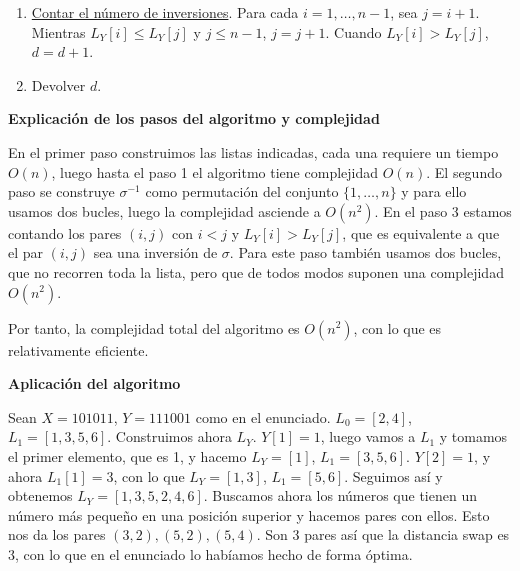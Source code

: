 \documentclass[twoside]{article}
\begin{document}
\begin{solucion}
\begin{enumerate}
\item \underline{Contar el número de inversiones}. Para cada $i=1,\dots, n-1$, sea $j=i+1$. Mientras $L_Y[i]\leq L_Y[j]$ y $j\leq n-1$, $j=j+1$. Cuando $L_Y[i]> L_Y[j]$, $d=d+1$.  

\item Devolver $d$. 
\end{enumerate}

\vspace{0.8cm}

\textbf{Explicación de los pasos del algoritmo y complejidad}

En el primer paso construimos las listas indicadas, cada una requiere un tiempo $O(n)$, luego hasta el paso 1 el algoritmo tiene complejidad $O(n)$. 
El segundo paso se construye $\sigma^{-1}$ como permutación del conjunto $\{1,\dots, n\}$ y para ello usamos dos bucles, luego la complejidad asciende a $O(n^2)$. En el paso 3 estamos contando los pares $(i,j)$ con $i<j$ y $L_Y[i]>L_Y[j]$, que es equivalente a que el par $(i,j)$ sea una inversión de $\sigma$. Para este paso también usamos dos bucles, que no recorren toda la lista, pero que de todos modos suponen una complejidad $O(n^2)$. 

Por tanto, la complejidad total del algoritmo es $O(n^2)$, con lo que es relativamente eficiente. 
 
\vspace{0.8cm}

\textbf{Aplicación del algoritmo}

Sean $X=101011$, $Y=111001$ como en el enunciado. $L_0=[2,4]$, $L_1=[1,3,5,6]$. Construimos ahora $L_Y$. $Y[1]=1$, luego vamos a $L_1$ y tomamos el primer elemento, que es 1, y hacemo $L_Y=[1]$, $L_1=[3,5,6]$. $Y[2]=1$, y ahora $L_1[1]=3$, con lo que $L_Y=[1,3]$, $L_1=[5,6]$. Seguimos así y obtenemos $L_Y=[1,3,5,2,4,6]$. Buscamos ahora los números que tienen un número más pequeño en una posición superior y hacemos pares con ellos. Esto nos da los pares $(3,2), (5,2), (5,4)$. Son 3 pares así que la distancia swap es 3, con lo que en el enunciado lo habíamos hecho de forma óptima. 

%




\end{solucion}
\end{document}

